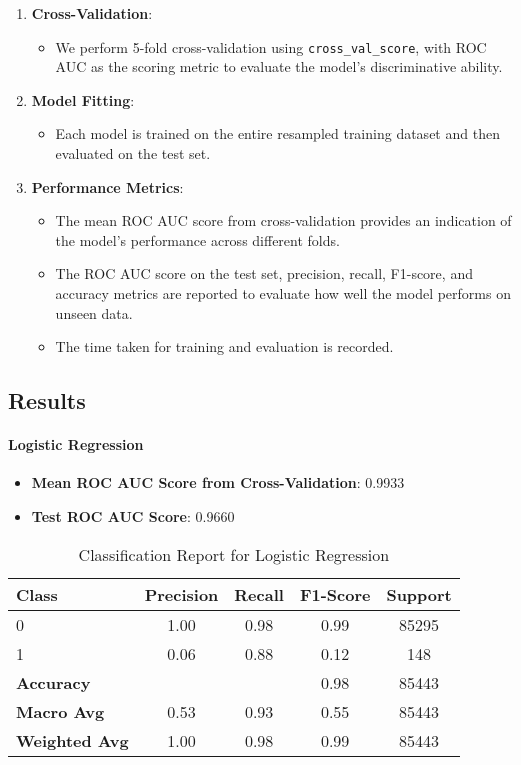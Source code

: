 \documentclass{article}
\begin{document}
\begin{enumerate}
    \item \textbf{Cross-Validation}:
    \begin{itemize}
        \item We perform 5-fold cross-validation using \texttt{cross\_val\_score}, with ROC AUC as the scoring metric to evaluate the model’s discriminative ability.
    \end{itemize}
    \item \textbf{Model Fitting}:
    \begin{itemize}
        \item Each model is trained on the entire resampled training dataset and then evaluated on the test set.
    \end{itemize}
    \item \textbf{Performance Metrics}:
    \begin{itemize}
        \item The mean ROC AUC score from cross-validation provides an indication of the model’s performance across different folds.
        \item The ROC AUC score on the test set, precision, recall, F1-score, and accuracy metrics are reported to evaluate how well the model performs on unseen data.
        \item The time taken for training and evaluation is recorded.
    \end{itemize}
\end{enumerate}

\subsection{Results}

\paragraph{Logistic Regression}
\begin{itemize}
    \item \textbf{Mean ROC AUC Score from Cross-Validation}: 0.9933
    \item \textbf{Test ROC AUC Score}: 0.9660
\end{itemize}

\begin{table}[h!]
\centering
\caption{Classification Report for Logistic Regression}
\begin{tabular}{lcccc}
\hline
\textbf{Class} & \textbf{Precision} & \textbf{Recall} & \textbf{F1-Score} & \textbf{Support} \\
\hline
0 & 1.00 & 0.98 & 0.99 & 85295 \\
1 & 0.06 & 0.88 & 0.12 & 148 \\
\hline
\textbf{Accuracy} & & & 0.98 & 85443 \\
\textbf{Macro Avg} & 0.53 & 0.93 & 0.55 & 85443 \\
\textbf{Weighted Avg} & 1.00 & 0.98 & 0.99 & 85443 \\
\hline
\end{tabular}
\end{table}
\end{document}
